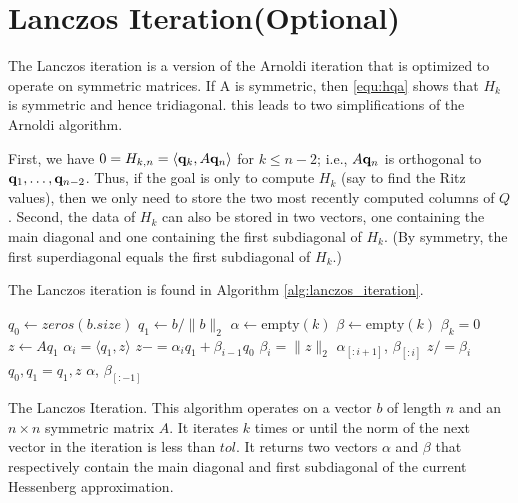 \section*{Lanczos Iteration(Optional)}
The Lanczos iteration is a version of the Arnoldi iteration that is optimized to operate on symmetric matrices.
If A is symmetric, then \eqref{equ:hqa} shows that $H_k$ is symmetric and hence tridiagonal.
this leads to two simplifications of the Arnoldi algorithm.

First, we have $0=H_{k, n}=\langle {\bf q}_k, A{\bf q}_n \rangle$ for $k \leq n-2$; i.e., $A{\bf q}_n$ is orthogonal to ${\bf q}_1, \ldots, {\bf q}_{n-2}$. 
Thus, if the goal is only to compute $H_k$ (say to find the Ritz values), then we only need to store the two most recently computed columns of $Q$.
Second, the data of $H_k$ can also be stored in two vectors, one containing the main diagonal and one containing the first subdiagonal of $H_k$. 
(By symmetry, the first superdiagonal equals the first subdiagonal of $H_k$.)

The Lanczos iteration is found in Algorithm \ref{alg:lanczos_iteration}.

\begin{algorithm}
\begin{algorithmic}[1]
	\State $q_0 \gets zeros(b.size)$								
	\State $q_1 \gets b/\|b\|_2$
	\State $\alpha \gets \text{empty}\left(k\right)$
	\State $\beta \gets \text{empty}\left(k\right)$
	\State $\beta_{k} = 0$
										
		\State $z \gets Aq_1$					
		\State $\alpha_{i} = \langle q_1, z \rangle$				
		\State $z -= \alpha_i q_1 + \beta_{i-1} q_0$				
		\State $\beta_{i} = \|z\|_2$						
										
			\State {} $\alpha_{[: i+1]}$, $\beta_{[: i]}$
		\EndIf
		\State $z /= \beta_i$
		\State $q_0, q_1 = q_1, z$						
	\EndFor
	\State {} $\alpha$, $\beta_{[: -1]}$
\EndProcedure
\end{algorithmic}
\caption{The Lanczos Iteration. This algorithm operates on a vector $b$ of length $n$ and an $n \times n$ symmetric matrix $A$. It iterates $k$ times or until the norm of the next vector in the iteration is less than $tol$. It returns two vectors $\alpha$ and $\beta$ that respectively contain the main diagonal and first subdiagonal of the current Hessenberg approximation.}
\label{alg:lanczos_iteration}
\end{algorithm}


